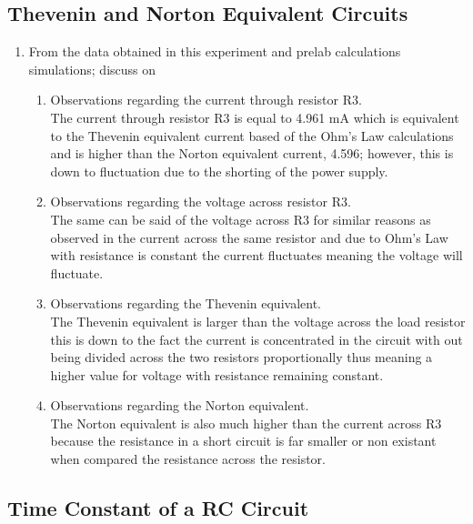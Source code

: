 \documentclass[a4paper]{article}
\begin{document}
\subsection{Thevenin and Norton Equivalent Circuits}

\begin{enumerate}
    \item From the data obtained in this experiment and prelab calculations simulations; discuss on\\
    \begin{enumerate}
        \item Observations regarding the current through resistor R3.\\
        The current through resistor R3 is equal to 4.961 mA which is equivalent to the Thevenin equivalent current based of the Ohm's Law calculations and is higher than the Norton equivalent current, 4.596; however, this is down to fluctuation due to the shorting of the power supply.
        \item Observations regarding the voltage across resistor R3.\\
        The same can be said of the voltage across R3 for similar reasons as observed in the current across the same resistor and due to Ohm's Law with resistance is constant the current fluctuates meaning the voltage will fluctuate. 
        \item Observations regarding the Thevenin equivalent.\\
        The Thevenin equivalent is larger than the voltage across the load resistor this is down to the fact the current is concentrated in the circuit with out being divided across the two resistors proportionally thus meaning a higher value for voltage with resistance remaining constant.
        \item Observations regarding the Norton equivalent.\\
        The Norton equivalent is also much higher than the current across R3 because the resistance in a short circuit is far smaller or non existant when compared the resistance across the resistor.  
    \end{enumerate}
\end{enumerate}

\subsection{Time Constant of a RC Circuit}
\end{document}

